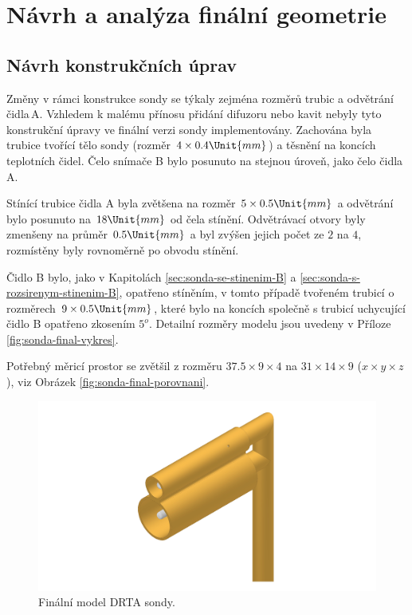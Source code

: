 \section{Návrh a analýza finální geometrie} \label{sec:finalni-geometrie}
    \subsection{Návrh konstrukčních úprav}
        Změny v rámci konstrukce sondy se týkaly zejména rozměrů trubic a odvětrání čidla\,A. Vzhledem k malému přínosu přidání difuzoru nebo kavit nebyly tyto konstrukční úpravy ve finální verzi sondy implementovány. Zachována byla trubice tvořící tělo sondy (rozměr $4 \times 0.4 \Unit{mm}$) a těsnění na koncích teplotních čidel. Čelo snímače B bylo posunuto na stejnou úroveň, jako čelo čidla\,A. 
        
        Stínící trubice čidla A byla zvětšena na rozměr $5 \times 0.5 \Unit{mm}$ a odvětrání bylo posunuto na $18 \Unit{mm}$ od čela stínění. Odvětrávací otvory byly zmenšeny na průměr $0.5 \Unit{mm}$ a byl zvýšen jejich počet ze $2$ na $4$, rozmístěny byly rovnoměrně po obvodu stínění.

        Čidlo B bylo, jako v Kapitolách \ref{sec:sonda-se-stinenim-B} a \ref{sec:sonda-s-rozsirenym-stinenim-B}, opatřeno stíněním, v tomto případě tvořeném trubicí o rozměrech $9 \times 0.5 \Unit{mm}$, které bylo na koncích společně s trubicí uchycující čidlo B opatřeno zkosením $5^o$. Detailní rozměry modelu jsou uvedeny v Příloze \ref{fig:sonda-final-vykres}.

        Potřebný měricí prostor se zvětšil z rozměru $37.5 \times 9 \times 4$ na $31 \times 14 \times 9$ ($x \times y \times z$), viz Obrázek \ref{fig:sonda-final-porovnani}.

        \begin{figure}[ht!]
            \centering
            \includegraphics[width=\textwidth]{500_FINAL/sonda_final.png}
            \caption{Finální model DRTA sondy.}
            \label{fig:sonda-final}
        \end{figure}

